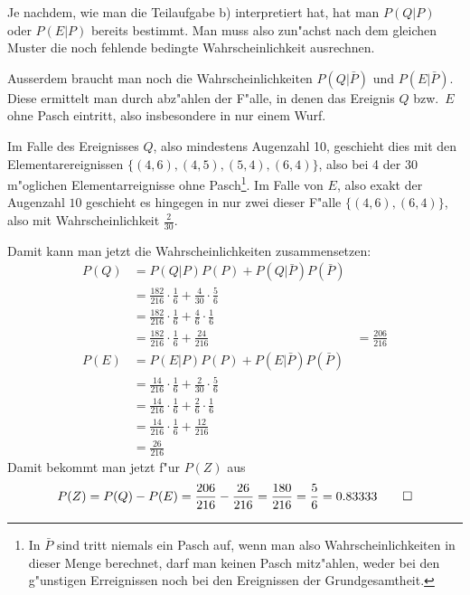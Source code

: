 \begin{loesung}
\begin{teilaufgaben}
Je nachdem, wie man die Teilaufgabe b) interpretiert hat, hat man $P(Q|P)$
oder $P(E|P)$ bereits bestimmt. Man muss also zun"achst nach dem gleichen
Muster die noch fehlende bedingte Wahrscheinlichkeit ausrechnen.

Ausserdem braucht man noch die Wahrscheinlichkeiten $P(Q|\bar P)$ und
$P(E|\bar P)$. Diese ermittelt man durch abz"ahlen der F"alle, in denen
das Ereignis $Q$ bzw.~$E$ ohne Pasch eintritt, also insbesondere in nur
einem Wurf.

Im Falle des Ereignisses $Q$, also mindestens Augenzahl 10, geschieht dies
mit den Elementarereignissen $\{(4,6),(4,5),(5,4),(6,4)\}$, also bei 4 der 30
m"oglichen Elementarreignisse ohne Pasch\footnote{In $\bar P$ sind tritt
niemals ein Pasch auf, wenn man also Wahrscheinlichkeiten in dieser Menge
berechnet, darf man keinen Pasch mitz"ahlen, weder bei den
g"unstigen Erreignissen noch bei den Ereignissen der Grundgesamtheit.}.
Im Falle von $E$, also exakt
der Augenzahl $10$ geschieht es hingegen in nur zwei dieser
F"alle $\{(4,6), (6,4)\}$, also mit Wahrscheinlichkeit $\frac{2}{30}$.

Damit kann man jetzt die Wahrscheinlichkeiten zusammensetzen:
\begin{align*}
P(Q)&=P(Q|P)P(P) + P(Q|\bar P)P(\bar P)\\
    &=\frac{182}{216}\cdot\frac16 + \frac4{30}\cdot\frac56\\
    &=\frac{182}{216}\cdot\frac16 + \frac4{6}\cdot\frac16\\
    &=\frac{182}{216}\cdot\frac16 + \frac{24}{216}
    &=\frac{206}{216}\\
P(E)&=P(E|P)P(P) + P(E|\bar P)P(\bar P)\\
    &=\frac{14}{216}\cdot\frac16 + \frac2{30}\cdot\frac56\\
    &=\frac{14}{216}\cdot\frac16 + \frac2{6}\cdot\frac16\\
    &=\frac{14}{216}\cdot\frac16 + \frac{12}{216}\\
    &=\frac{26}{216}
\end{align*}
Damit bekommt man jetzt f"ur $P(Z)$ aus
\[
P(Z)=P(Q)-P(E)
=
    \frac{206}{216}
    -\frac{26}{216}
=\frac{180}{216}=\frac56=0.83333
\qedhere
\]
\end{teilaufgaben}
\end{loesung}

